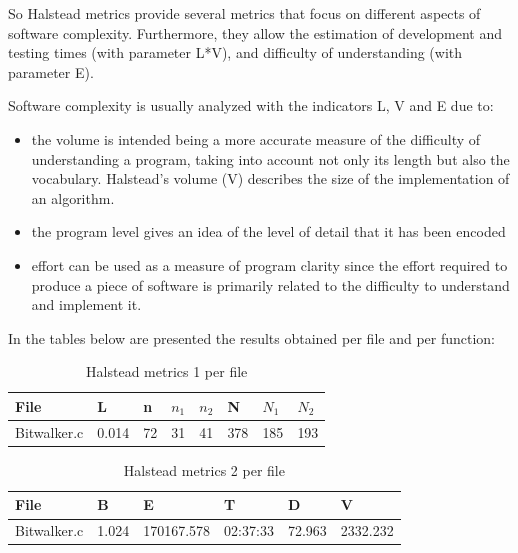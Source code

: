 \begin{description}
So Halstead metrics provide several metrics that focus on different aspects of software complexity. Furthermore, they allow the estimation of development and testing times (with parameter L*V), and difficulty of understanding (with parameter E). 

Software complexity is usually analyzed with the indicators L, V and E due to:
\begin{itemize}
\item the volume is intended being a more accurate measure of the difficulty of understanding a program, taking into account not only its length but also the vocabulary. Halstead's volume (V) describes the size of the implementation of an algorithm.
\item the program level gives an idea of ​​the level of detail that it has been encoded
\item effort can be used as a measure of program clarity since the effort required to produce a piece of software is primarily related to the difficulty to understand and implement it.
\end{itemize}

In the tables below are presented the results obtained per file and per function:

\begin{longtable}{||p{}|p{}|p{}|p{}|p{}|p{}|p{}|p{}||}
  \caption{Halstead metrics 1 per file}\\
    \hline\hline
    \textbf{File} &\textbf{L} & \textbf{n} & \textbf{$n_1$} & \textbf{$n_2$} & \textbf{N} & \textbf{$N_1$} & \textbf{$N_2$}\\
    \hline\hline
    \endhead
    \hline\hline
    \endfoot
    Bitwalker.c & 0.014 & 72 & 31 & 41 & 378 & 185 & 193
    \\
    \hline
   \end{longtable}
   
\begin{longtable}{||p{}|p{}|p{}|p{}|p{}|p{}||}
  \caption{Halstead metrics 2 per file}\\
    \hline\hline
    \textbf{File} &\textbf{B} & \textbf{E} & \textbf{T} & \textbf{D} & \textbf{V}\\
    \hline\hline
    \endhead
    \hline\hline
    \endfoot
    Bitwalker.c & 1.024 & 170167.578 & 02:37:33 & 72.963 & 2332.232 
    \\
    \hline
   \end{longtable}
   

\end{description}
